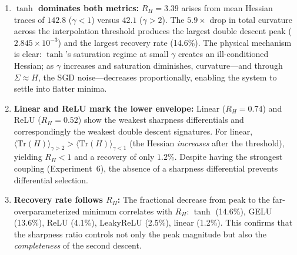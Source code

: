 \documentclass[
  journal=largetwo,
  simfonts=false,
  year=2025,
  volume=37,
]{cup-journal}
\begin{document}
\begin{enumerate}
    \item \textbf{$\tanh$ dominates both metrics:} $R_H = 3.39$ arises from mean Hessian traces of $142.8$ ($\gamma<1$) versus $42.1$ ($\gamma>2$). The $5.9\times$ drop in total curvature across the interpolation threshold produces the largest double descent peak ($2.845 \times 10^{-3}$) and the largest recovery rate (14.6\%). The physical mechanism is clear: $\tanh$'s saturation regime at small $\gamma$ creates an ill-conditioned Hessian; as $\gamma$ increases and saturation diminishes, curvature---and through $\Sigma \approx H$, the SGD noise---decreases proportionally, enabling the system to settle into flatter minima.

    \item \textbf{Linear and ReLU mark the lower envelope:} Linear ($R_H = 0.74$) and ReLU ($R_H = 0.52$) show the weakest sharpness differentials and correspondingly the weakest double descent signatures. For linear, $\langle\mathrm{Tr}(H)\rangle_{\gamma>2} > \langle\mathrm{Tr}(H)\rangle_{\gamma<1}$ (the Hessian \textit{increases} after the threshold), yielding $R_H < 1$ and a recovery of only $1.2\%$. Despite having the strongest coupling (Experiment~6), the absence of a sharpness differential prevents differential selection.

    \item \textbf{Recovery rate follows $R_H$:} The fractional decrease from peak to the far-overparameterized minimum correlates with $R_H$: $\tanh$ (14.6\%), GELU (13.6\%), ReLU (4.1\%), LeakyReLU (2.5\%), linear (1.2\%). This confirms that the sharpness ratio controls not only the peak magnitude but also the \textit{completeness} of the second descent.
\end{enumerate}
\end{document}
